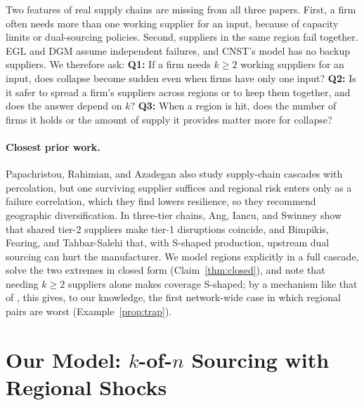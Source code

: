 \documentclass[10pt]{article}
\begin{document}
Two features of real supply chains are missing from all three papers. First, a firm often needs more than one working supplier for an input, because of capacity limits or dual-sourcing policies. Second, suppliers in the same region fail together. EGL and DGM assume independent failures, and CNST's model has no backup suppliers. We therefore ask: \textbf{Q1:} If a firm needs $k\ge2$ working suppliers for an input, does collapse become sudden even when firms have only one input? \textbf{Q2:} Is it safer to spread a firm's suppliers across regions or to keep them together, and does the answer depend on $k$? \textbf{Q3:} When a region is hit, does the number of firms it holds or the amount of supply it provides matter more for collapse?

\paragraph{Closest prior work.} Papachristou, Rahimian, and Azadegan \cite{pra2026} also study supply-chain cascades with percolation, but one surviving supplier suffices and regional risk enters only as a failure correlation, which they find lowers resilience, so they recommend geographic diversification. In three-tier chains, Ang, Iancu, and Swinney \cite{ais2017} show that shared tier-2 suppliers make tier-1 disruptions coincide, and Bimpikis, Fearing, and Tahbaz-Salehi \cite{bft2018} that, with S-shaped production, upstream dual sourcing can hurt the manufacturer. We model regions explicitly in a full cascade, solve the two extremes in closed form (Claim~\ref{thm:closed}), and note that needing $k\ge2$ suppliers alone makes coverage S-shaped; by a mechanism like that of \cite{bft2018}, this gives, to our knowledge, the first network-wide case in which regional pairs are worst (Example~\ref{prop:trap}).

\section{Our Model: \texorpdfstring{$k$-of-$n$}{k-of-n} Sourcing with Regional Shocks}
\end{document}
